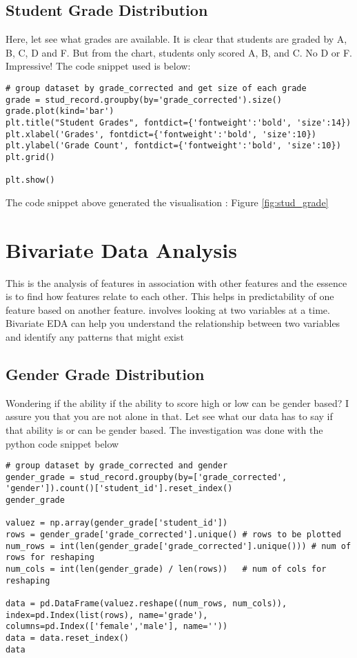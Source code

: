 \subsection{Student Grade Distribution}
Here, let see what grades are available. It is clear that students are graded by A, B, C, D and F. But from the chart, students only scored A, B, and C. No D or F. Impressive! The code snippet used is below: 
\begin{verbatim}
# group dataset by grade_corrected and get size of each grade
grade = stud_record.groupby(by='grade_corrected').size()
grade.plot(kind='bar')
plt.title("Student Grades", fontdict={'fontweight':'bold', 'size':14})
plt.xlabel('Grades', fontdict={'fontweight':'bold', 'size':10})
plt.ylabel('Grade Count', fontdict={'fontweight':'bold', 'size':10})
plt.grid()

plt.show()
\end{verbatim}

The code snippet above generated the visualisation : Figure \ref{fig:stud_grade}


\section{Bivariate Data Analysis}
This is the analysis of features in association with other features and the essence is to find how features relate to each other. This helps in predictability of one feature based on another feature.
 involves looking at two variables at a time. Bivariate EDA can help you understand the relationship between two variables and identify any patterns that might exist \cite{chip_types_2023}
 
 \subsection{Gender Grade Distribution}
 Wondering if the ability if the ability to score high or low can be gender based? I assure you that you are not alone in that. Let see what our data has to say if that ability is or can be gender based. The investigation was done with the python code snippet below
 
\begin{verbatim}
# group dataset by grade_corrected and gender
gender_grade = stud_record.groupby(by=['grade_corrected', 'gender']).count()['student_id'].reset_index()
gender_grade

valuez = np.array(gender_grade['student_id'])
rows = gender_grade['grade_corrected'].unique() # rows to be plotted
num_rows = int(len(gender_grade['grade_corrected'].unique())) # num of rows for reshaping
num_cols = int(len(gender_grade) / len(rows))   # num of cols for reshaping

data = pd.DataFrame(valuez.reshape((num_rows, num_cols)),
index=pd.Index(list(rows), name='grade'),
columns=pd.Index(['female','male'], name=''))
data = data.reset_index()
data
\end{verbatim} 

